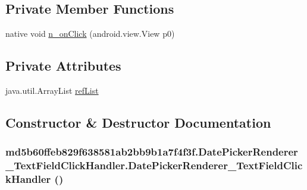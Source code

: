 \subsection*{Private Member Functions}
\begin{CompactItemize}
\item 
native void \hyperlink{classmd5b60ffeb829f638581ab2bb9b1a7f4f3f_1_1_date_picker_renderer___text_field_click_handler_7fd1c4dfec7e868993bf94df202adbe2}{n\_\-onClick} (android.view.View p0)
\end{CompactItemize}
\subsection*{Private Attributes}
\begin{CompactItemize}
\item 
java.util.ArrayList \hyperlink{classmd5b60ffeb829f638581ab2bb9b1a7f4f3f_1_1_date_picker_renderer___text_field_click_handler_ff62dcfd49601b9c6b710036d9b041f1}{refList}
\end{CompactItemize}


\subsection{Constructor \& Destructor Documentation}
\hypertarget{classmd5b60ffeb829f638581ab2bb9b1a7f4f3f_1_1_date_picker_renderer___text_field_click_handler_4693a3ab453623ea19b92342908cbe4c}{
\subsubsection[{DatePickerRenderer\_\-TextFieldClickHandler}]{\setlength{\rightskip}{0pt plus 5cm}md5b60ffeb829f638581ab2bb9b1a7f4f3f.DatePickerRenderer\_\-TextFieldClickHandler.DatePickerRenderer\_\-TextFieldClickHandler ()}}
\label{classmd5b60ffeb829f638581ab2bb9b1a7f4f3f_1_1_date_picker_renderer___text_field_click_handler_4693a3ab453623ea19b92342908cbe4c}




